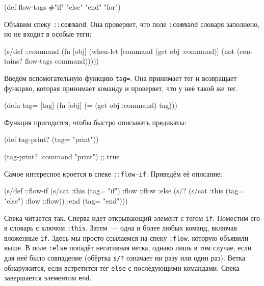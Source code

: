 \begin{english}
  \begin{clojure}
(def flow-tags #{"if" "else" "end" "for"})
  \end{clojure}
\end{english}

Объявим спеку \texttt{::command}. Она проверяет, что поле \texttt{:command}
словаря заполнено, но не входит в особые теги:

\begin{english}
  \begin{clojure}
(s/def ::command
  (fn [obj]
    (when-let [command (get obj :command)]
      (not (contains? flow-tags command)))))
  \end{clojure}
\end{english}

Введём вспомогательную функцию \texttt{tag=}. Она принимает тег и возвращает
функцию, которая принимает команду и проверяет, что у неё такой же тег.

\begin{english}
  \begin{clojure}
(defn tag= [tag]
  (fn [obj]
    (= (get obj :command) tag)))
  \end{clojure}
\end{english}

Функция пригодится, чтобы быстро описывать предикаты:

\begin{english}
  \begin{clojure}
(def tag-print? (tag= "print"))

(tag-print? {:command "print"})
;; true
  \end{clojure}
\end{english}

Самое интересное кроется в спеке \texttt{::flow-if}. Приведём её описание:

\begin{english}
  \begin{clojure}
(s/def ::flow-if
  (s/cat :this (tag= "if")
         :flow ::flow
         :else (s/? (s/cat :this (tag= "else")
                           :flow ::flow))
         :end (tag= "end")))
  \end{clojure}
\end{english}

Спека читается так. Сперва идет открывающий элемент с тегом
\texttt{if}. Поместим его в словарь с ключом \texttt{:this}. Затем~--- одна и
более любых команд, включая вложенные \texttt{if}. Здесь мы просто ссылаемся на
спеку \texttt{:flow}, которую объявили выше. В поле \texttt{:else} попадёт
негативная ветка, однако лишь в том случае, если для неё было совпадение
(обёртка \verb|s/?| означает ни разу или один раз). Ветка обнаружится, если
встретится тег \verb|else| с последующими командами. Спека завершается элементом
\verb|end|.

